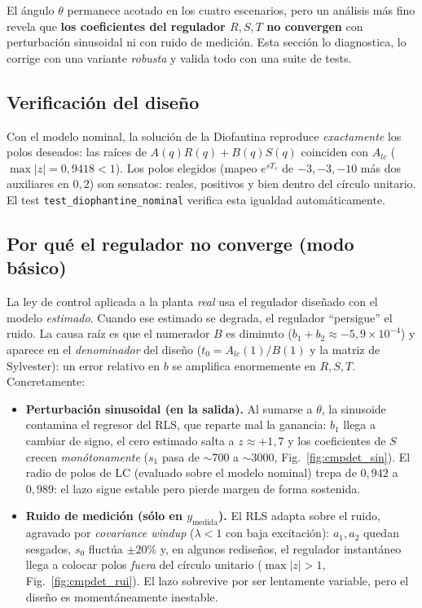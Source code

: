 \documentclass[a4paper,11pt]{report}
\begin{document}
El ángulo $\theta$ permanece acotado en los cuatro escenarios, pero un análisis
más fino revela que \textbf{los coeficientes del regulador $R,S,T$ no convergen}
con perturbación sinusoidal ni con ruido de medición. Esta sección lo diagnostica,
lo corrige con una variante \emph{robusta} y valida todo con una suite de tests.

\subsection{Verificación del diseño}

Con el modelo nominal, la solución de la Diofantina reproduce \emph{exactamente}
los polos deseados: las raíces de $A(q)R(q)+B(q)S(q)$ coinciden con $A_{lc}$
($\max|z| = 0{,}9418 < 1$). Los polos elegidos (mapeo $e^{sT_s}$ de $-3,-3,-10$
más dos auxiliares en $0{,}2$) son sensatos: reales, positivos y bien dentro del
círculo unitario. El test \texttt{test\_diophantine\_nominal} verifica esta
igualdad automáticamente.

\subsection{Por qué el regulador no converge (modo básico)}

La ley de control aplicada a la planta \emph{real} usa el regulador diseñado con
el modelo \emph{estimado}. Cuando ese estimado se degrada, el regulador
``persigue'' el ruido. La causa raíz es que el numerador $B$ es diminuto
($b_1{+}b_2 \approx -5{,}9\times10^{-4}$) y aparece en el \emph{denominador} del
diseño ($t_0 = A_{lc}(1)/B(1)$ y la matriz de Sylvester): un error relativo en
$b$ se amplifica enormemente en $R,S,T$. Concretamente:
\begin{itemize}[nosep]
  \item \textbf{Perturbación sinusoidal (en la salida).} Al sumarse a $\theta$,
  la sinusoide contamina el regresor del RLS, que reparte mal la ganancia:
  $b_1$ llega a cambiar de signo, el cero estimado salta a $z\approx+1{,}7$ y los
  coeficientes de $S$ crecen \emph{monótonamente} ($s_1$ pasa de $\sim700$ a
  $\sim3000$, Fig.~\ref{fig:cmpdet_sin}). El radio de polos de LC (evaluado sobre
  el modelo nominal) trepa de $0{,}942$ a $0{,}989$: el lazo sigue estable pero
  pierde margen de forma sostenida.
  \item \textbf{Ruido de medición (sólo en $y_{\text{medida}}$).} El RLS adapta
  sobre el ruido, agravado por \emph{covariance windup} ($\lambda<1$ con baja
  excitación): $a_1,a_2$ quedan sesgados, $s_0$ fluctúa $\pm20\%$ y, en algunos
  rediseños, el regulador instantáneo llega a colocar polos \emph{fuera} del
  círculo unitario ($\max|z|>1$, Fig.~\ref{fig:cmpdet_rui}). El lazo sobrevive
  por ser lentamente variable, pero el diseño es momentáneamente inestable.
\end{itemize}
\end{document}
